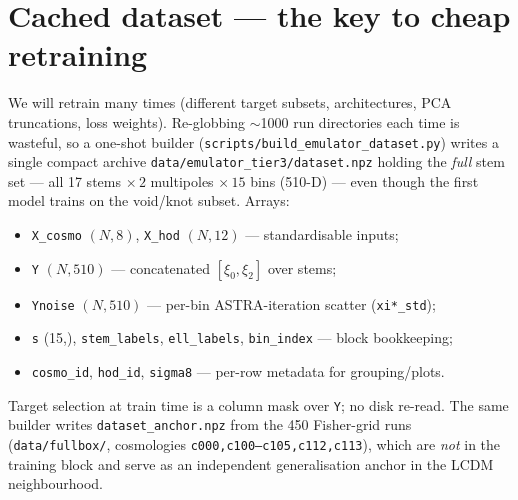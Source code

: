 \documentclass[11pt]{article}
\newcommand{\code}[1]{\texttt{#1}}
\begin{document}
\section{Cached dataset --- the key to cheap retraining}
We will retrain many times (different target subsets, architectures,
PCA truncations, loss weights). Re-globbing $\sim$1000 run directories each time
is wasteful, so a one-shot builder
(\code{scripts/build\_emulator\_dataset.py}) writes a single compact archive
\code{data/emulator\_tier3/dataset.npz} holding the \emph{full} stem set --- all
17 stems $\times\,2$ multipoles $\times\,15$ bins (510-D) --- even though the
first model trains on the void/knot subset. Arrays:
\begin{itemize}
\item \code{X\_cosmo} $(N,8)$, \code{X\_hod} $(N,12)$ --- standardisable inputs;
\item \code{Y} $(N,510)$ --- concatenated $[\xi_0,\xi_2]$ over stems;
\item \code{Ynoise} $(N,510)$ --- per-bin ASTRA-iteration scatter (\code{xi*\_std});
\item \code{s} (15,), \code{stem\_labels}, \code{ell\_labels}, \code{bin\_index} --- block bookkeeping;
\item \code{cosmo\_id}, \code{hod\_id}, \code{sigma8} --- per-row metadata for grouping/plots.
\end{itemize}
Target selection at train time is a column mask over \code{Y}; no disk re-read.
The same builder writes \code{dataset\_anchor.npz} from the 450 Fisher-grid runs
(\code{data/fullbox/}, cosmologies \code{c000,c100--c105,c112,c113}), which are
\emph{not} in the training block and serve as an independent generalisation
anchor in the LCDM neighbourhood.
\end{document}
